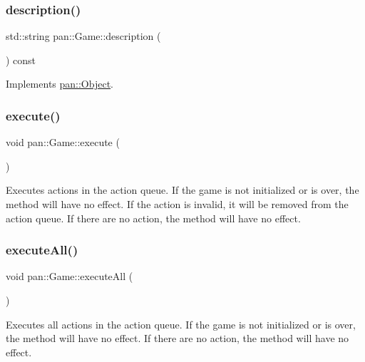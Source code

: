 \subsubsection{\texorpdfstring{description()}{description()}}
{\footnotesize\ttfamily std\+::string pan\+::\+Game\+::description (\begin{DoxyParamCaption}{ }\end{DoxyParamCaption}) const\hspace{0.3cm}{\ttfamily [virtual]}}



Implements \hyperlink{classpan_1_1_object_a2bb6d3117bb32f5774657c83f118ed8b}{pan\+::\+Object}.

\mbox{\label{classpan_1_1_game_ad252b2f2c65beb9584ab63d96787fed7}} 
\subsubsection{\texorpdfstring{execute()}{execute()}}
{\footnotesize\ttfamily void pan\+::\+Game\+::execute (\begin{DoxyParamCaption}{ }\end{DoxyParamCaption})}

Executes actions in the action queue. If the game is not initialized or is over, the method will have no effect. If the action is invalid, it will be removed from the action queue. If there are no action, the method will have no effect. \mbox{\label{classpan_1_1_game_a19a92963216ec73c0718cab214f89e85}} 
\subsubsection{\texorpdfstring{execute\+All()}{executeAll()}}
{\footnotesize\ttfamily void pan\+::\+Game\+::execute\+All (\begin{DoxyParamCaption}{ }\end{DoxyParamCaption})}

Executes all actions in the action queue. If the game is not initialized or is over, the method will have no effect. If there are no action, the method will have no effect. \mbox{\label{classpan_1_1_game_a0fcbd5cc3e1fe836915356478d781fc4}} 
